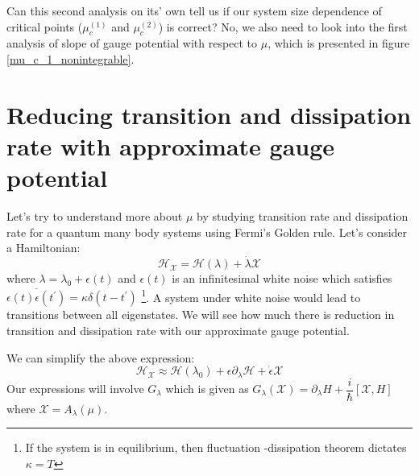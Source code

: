 \documentclass[11pt,a4paper]{article}
\begin{document}
Can this second analysis on its' own tell us if our system size dependence of critical points ($\mu_c^{(1)}$ and $\mu_c^{(2)}$) is correct? No, we also need to look into the first analysis of slope of gauge potential with respect to $\mu$, which is presented in  figure \ref{mu_c_1_nonintegrable}.

%
%

\section{Reducing transition and dissipation rate with approximate gauge potential }
Let's try to understand more about $\mu$ by studying transition rate and dissipation rate for a quantum many body systems using Fermi's Golden rule. Let's consider a Hamiltonian:
\begin{equation}
\mathcal{H}_{\mathcal{X}} = \mathcal{H} (\lambda) + \dot{\lambda} \mathcal{X}
\end{equation}
where $\lambda= \lambda_0 + \epsilon(t)$ and  $\epsilon(t)$  is an infinitesimal white noise which satisfies $\overline{ \epsilon(t) \epsilon(t^{\prime})}= \kappa \delta(t -t^{\prime})$ \footnote{If the system is in equilibrium, then fluctuation -dissipation theorem dictates $\kappa = T$}. 
A system under white noise would lead to transitions between all eigenstates. We will see how much there is reduction in transition and dissipation rate with our approximate gauge potential.

We can simplify the above expression:
\begin{equation}
\mathcal{H}_{\mathcal{X}} \approx \mathcal{H} (\lambda_0)+ \epsilon \partial_{\lambda}\mathcal{H} + \dot{\epsilon} \mathcal{X}
\end{equation}
Our expressions will involve $G_{\lambda}$ which is given as $G_{\lambda}(\mathcal{X} )= \partial_{\lambda} H + \dfrac{i}{\hbar} [\mathcal{X}, H] $ where $\mathcal{X}=A_{\lambda}(\mu)$.
\end{document}
